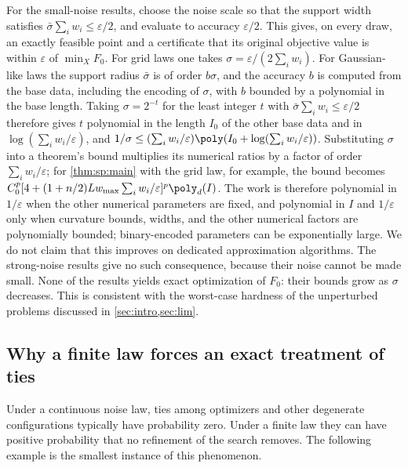 For the small-noise results, choose the noise scale so that the support
width satisfies $\bar\sigma\sum_iw_i\le\varepsilon/2$, and evaluate to
accuracy $\varepsilon/2$. This gives, on every draw, an exactly feasible
point and a certificate that its original objective value is within
$\varepsilon$ of $\min_XF_0$. For grid laws one takes
$\sigma=\varepsilon/(2\sum_iw_i)$. For Gaussian-like laws the support radius
$\bar\sigma$ is of order $b\sigma$, and the accuracy $b$ is computed from the
base data, including the encoding of $\sigma$, with $b$ bounded by a
polynomial in the base length. Taking $\sigma=2^{-t}$ for the least integer
$t$ with $\bar\sigma\sum_iw_i\le\varepsilon/2$ therefore gives $t$ polynomial
in the length $I_0$ of the other base data and in
$\log(\sum_iw_i/\varepsilon)$, and
$1/\sigma\le(\sum_iw_i/\varepsilon)\poly(I_0+\log(\sum_iw_i/\varepsilon))$.
Substituting $\sigma$ into a theorem's bound multiplies its numerical ratios
by a factor of order $\sum_iw_i/\varepsilon$; for \cref{thm:sp:main} with
the grid law, for example, the bound becomes
$C_0^p[4+(1+n/2)Lw_{\max}\sum_iw_i/\varepsilon]^p\poly_d(I)$. The work is
therefore polynomial in $1/\varepsilon$ when the other numerical parameters
are fixed, and polynomial in $I$ and $1/\varepsilon$ only when curvature
bounds, widths, and the other numerical factors are polynomially bounded;
binary-encoded parameters can be exponentially large. We do not claim that
this improves on dedicated approximation algorithms. The strong-noise results give no such
consequence, because their noise cannot be made small. None of the results
yields exact optimization of $F_0$: their bounds grow as $\sigma$ decreases.
This is consistent with the worst-case hardness of the unperturbed problems
discussed in \cref{sec:intro,sec:lim}.

\subsection{Why a finite law forces an exact treatment of ties}\label{sec:model:atom}

Under a continuous noise law, ties among optimizers and other degenerate
configurations typically have probability zero. Under a finite law they can
have positive probability that no refinement of the search removes. The
following example is the smallest instance of this phenomenon.

